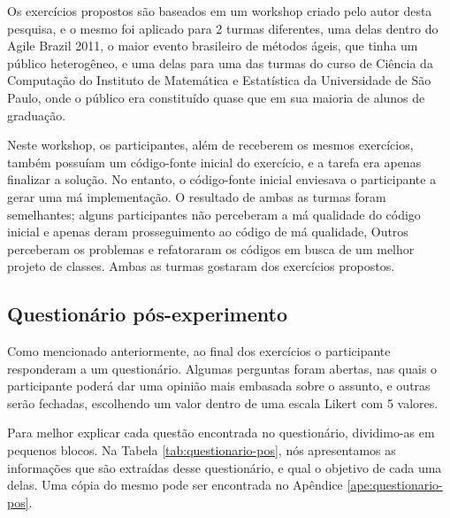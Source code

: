 Os exercícios propostos são baseados em um workshop criado pelo autor desta pesquisa, e o mesmo
foi aplicado para 2 turmas diferentes, uma delas dentro do Agile Brazil 2011, o
maior evento brasileiro de métodos ágeis, que tinha um público heterogêneo, e uma delas para
uma das turmas do curso de Ciência da Computação do Instituto de Matemática e Estatística da Universidade
de São Paulo, onde o público era constituído quase que em sua maioria de alunos de graduação. 

Neste workshop, os participantes, além de receberem os mesmos
exercícios, também possuíam um código-fonte inicial do exercício, e a tarefa era
apenas finalizar a solução. No entanto, o código-fonte inicial enviesava o participante a gerar
uma má implementação. O resultado de ambas as turmas foram semelhantes; alguns participantes
não perceberam a má qualidade do código inicial e apenas deram prosseguimento ao código
de má qualidade, Outros perceberam os problemas e refatoraram os códigos em busca
de um melhor projeto de classes. Ambas as turmas gostaram dos exercícios
propostos.


\subsection{Questionário pós-experimento}
\label{sec:questionario}

Como mencionado anteriormente, ao final dos exercícios o participante responderam a um questionário.
Algumas perguntas foram abertas, nas quais o participante poderá dar uma opinião mais embasada sobre o assunto,
e outras serão fechadas, escolhendo um valor dentro de uma escala
Likert com 5 valores.

Para melhor explicar cada questão encontrada no questionário, dividimo-as em pequenos blocos. 
Na Tabela \ref{tab:questionario-pos}, nós apresentamos
as informações que são extraídas desse questionário, e qual o objetivo de cada uma delas. Uma cópia
do mesmo pode ser encontrada no Apêndice \ref{ape:questionario-pos}.

